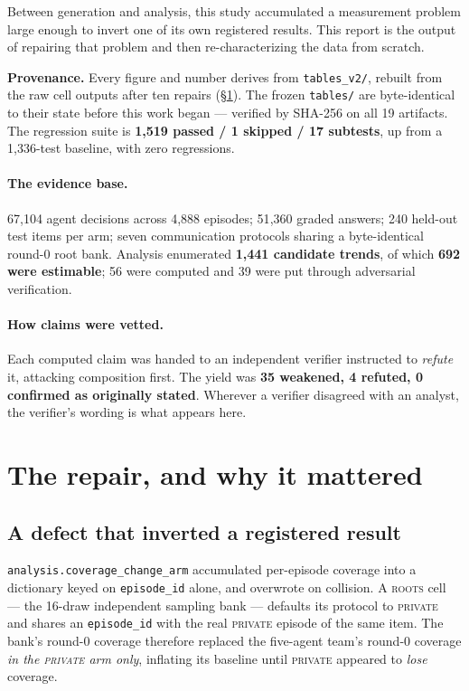 \documentclass[11pt]{article}
\begin{document}
Between generation and analysis, this study accumulated a measurement problem large enough to
invert one of its own registered results. This report is the output of repairing that problem and
then re-characterizing the data from scratch.

\begin{plainbox}
\small
\textbf{Provenance.} Every figure and number derives from \texttt{tables\_v2/}, rebuilt from the
raw cell outputs after ten repairs (\S\ref{sec:repair}). The frozen \texttt{tables/} are
byte-identical to their state before this work began --- verified by SHA-256 on all 19 artifacts.
The regression suite is \textbf{1{,}519 passed / 1 skipped / 17 subtests}, up from a 1{,}336-test
baseline, with zero regressions.
\end{plainbox}

\paragraph{The evidence base.} 67{,}104 agent decisions across 4{,}888 episodes; 51{,}360 graded
answers; 240 held-out test items per arm; seven communication protocols sharing a
byte-identical round-0 root bank. Analysis enumerated \textbf{1{,}441 candidate trends}, of which
\textbf{692 were estimable}; 56 were computed and 39 were put through adversarial verification.

\paragraph{How claims were vetted.} Each computed claim was handed to an independent verifier
instructed to \emph{refute} it, attacking composition first. The yield was
\textbf{35 weakened, 4 refuted, 0 confirmed as originally stated}. Wherever a verifier disagreed
with an analyst, the verifier's wording is what appears here.

\section{The repair, and why it mattered}
\label{sec:repair}

\subsection{A defect that inverted a registered result}

\texttt{analysis.coverage\_change\_arm} accumulated per-episode coverage into a dictionary keyed on
\texttt{episode\_id} alone, and overwrote on collision. A \textsc{roots} cell --- the 16-draw
independent sampling bank --- defaults its protocol to \textsc{private} and shares an
\texttt{episode\_id} with the real \textsc{private} episode of the same item. The bank's round-0
coverage therefore replaced the five-agent team's round-0 coverage \emph{in the \textsc{private}
arm only}, inflating its baseline until \textsc{private} appeared to \emph{lose} coverage.
\end{document}
